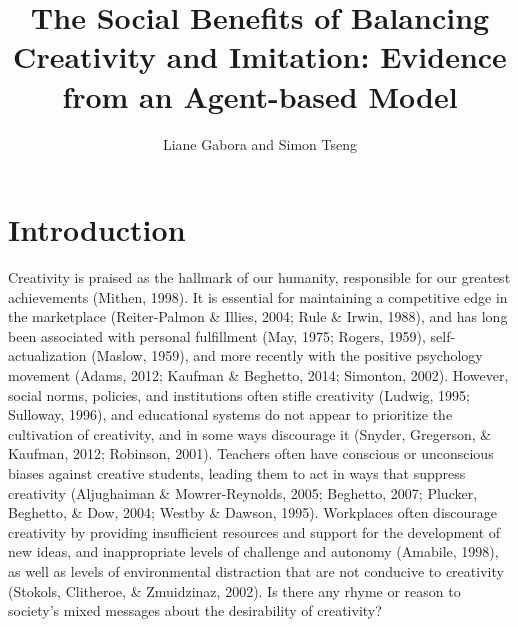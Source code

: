 \documentclass[a4paper,12pt,man,british]{apa6}
\title{The Social Benefits of Balancing Creativity and Imitation:
Evidence from an Agent-based Model}
\author{Liane Gabora and Simon Tseng}
\affiliation{University of British Columbia}
\begin{document}
\maketitle
\section{Introduction}
\label{sec:intro}
Creativity is praised as the hallmark of our humanity, responsible for our greatest achievements (Mithen, 1998). It is essential for maintaining a competitive edge in the marketplace (Reiter-Palmon \& Illies, 2004; Rule \& Irwin, 1988), and has long been associated with personal fulfillment (May, 1975; Rogers, 1959), self-actualization (Maslow, 1959), and more recently with the positive psychology movement (Adams, 2012; Kaufman \& Beghetto, 2014; Simonton, 2002).
However, 
social norms, policies, and institutions often stifle creativity (Ludwig, 1995; Sulloway, 1996), and educational systems do not appear to prioritize the cultivation of creativity, and in some ways discourage it (Snyder, Gregerson, \& Kaufman, 2012; Robinson, 2001). 
Teachers often have conscious or unconscious biases against creative students, 
leading them to act in ways that suppress creativity (Aljughaiman \& Mowrer-Reynolds, 2005; Beghetto, 2007; Plucker, Beghetto, \& Dow, 2004; Westby \& Dawson, 1995). Workplaces often discourage creativity by providing insufficient resources and support for the development of new ideas, and inappropriate levels of challenge and autonomy (Amabile, 1998), as well as levels of environmental distraction that are not conducive to creativity (Stokols, Clitheroe, \& Zmuidzinaz, 2002). 
Is there any rhyme or reason to society's mixed messages about the desirability of creativity?
\end{document}
